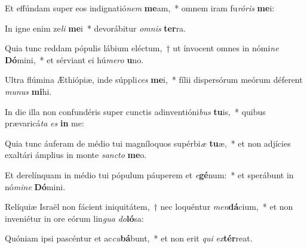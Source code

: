 \item Et effúndam super eos indignatió\textit{nem} \textbf{me}am,~* omnem iram fu\textit{ró}\textit{ris} \textbf{me}i:
\item In igne enim ze\textit{li} \textbf{me}i~* devorábitur \textit{om}\textit{nis} \textbf{ter}ra.
\item Quia tunc reddam pópulis lábium eléctum,~† ut ínvocent omnes in nómi\textit{ne} \textbf{Dó}mini,~* et sérviant ei hú\textit{me}\textit{ro} \textbf{u}no.
\item Ultra flúmina Æthiópiæ, inde súppli\textit{ces} \textbf{me}i,~* fílii dispersórum meórum déferent \textit{mu}\textit{nus} \textbf{mi}hi.
\item In die illa non confundéris super cunctis adinventióni\textit{bus} \textbf{tu}is,~* quibus prævaricá\textit{ta} \textit{es} \textbf{in} me:
\item Quia tunc áuferam de médio tui magníloquos supérbi\textit{æ} \textbf{tu}æ,~* et non adjícies exaltári ámplius in monte \textit{sanc}\textit{to} \textbf{me}o.
\item Et derelínquam in médio tui pópulum páuperem et \textit{e}\textbf{gé}num:~* et sperábunt in nó\textit{mi}\textit{ne} \textbf{Dó}mini.
\item Relíquiæ Israël non fácient iniquitátem,~† nec loquéntur \textit{men}\textbf{dá}cium,~* et non inveniétur in ore eórum lin\textit{gua} \textit{do}\textbf{ló}sa:
\item Quóniam ipsi pascéntur et ac\textit{cu}\textbf{bá}bunt,~* et non erit \textit{qui} \textit{ex}\textbf{tér}reat.
